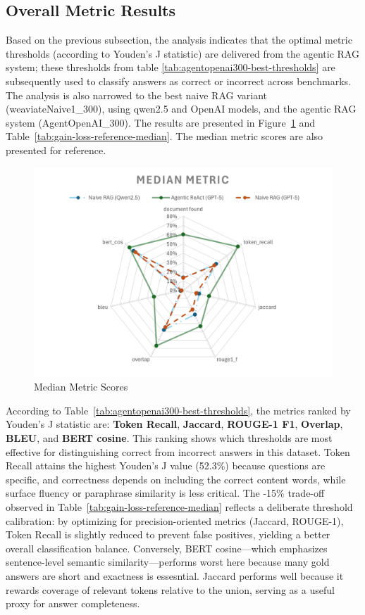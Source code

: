 \subsection{Overall Metric Results}
Based on the previous subsection, the analysis indicates that the optimal metric thresholds (according to Youden's J statistic) are delivered from the agentic RAG system; these thresholds from table \ref{tab:agentopenai300-best-thresholds} are subsequently used to classify answers as correct or incorrect across benchmarks. The analysis is also narrowed to the best naive RAG variant (weaviateNaive1\_300), using qwen2.5 and OpenAI models, and the agentic RAG system (AgentOpenAI\_300). The results are presented in Figure~\ref{fig:median-metric} and Table~\ref{tab:gain-loss-reference-median}. The median metric scores are also presented for reference.
\begin{figure}
    \centering
    \includegraphics[width=0.75\linewidth]{Figures/Median Metric.png}
    \caption{Median Metric Scores}\label{fig:median-metric}
\end{figure}
According to Table~\ref{tab:agentopenai300-best-thresholds}, the metrics ranked by Youden's J statistic are: \textbf{Token Recall}, \textbf{Jaccard}, \textbf{ROUGE-1 F1}, \textbf{Overlap}, \textbf{BLEU}, and \textbf{\gls{BERT} cosine}. This ranking shows which thresholds are most effective for distinguishing correct from incorrect answers in this dataset. Token Recall attains the highest Youden's J value (52.3\%) because questions are specific, and correctness depends on including the correct content words, while surface fluency or paraphrase similarity is less critical. The -15\% trade-off observed in Table~\ref{tab:gain-loss-reference-median} reflects a deliberate threshold calibration: by optimizing for precision-oriented metrics (Jaccard, ROUGE-1), Token Recall is slightly reduced to prevent false positives, yielding a better overall classification balance. Conversely, \gls{BERT} cosine—which emphasizes sentence-level semantic similarity—performs worst here because many gold answers are short and exactness is essesntial. Jaccard performs well because it rewards coverage of relevant tokens relative to the union, serving as a useful proxy for answer completeness.

